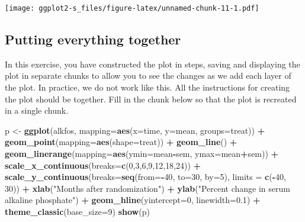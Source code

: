 \documentclass[
]{book}
\newenvironment{Shaded}{\begin{snugshade}}{\end{snugshade}}
\newcommand{\AttributeTok}[1]{\textcolor[rgb]{0.13,0.29,0.53}{#1}}
\newcommand{\DecValTok}[1]{\textcolor[rgb]{0.00,0.00,0.81}{#1}}
\newcommand{\FloatTok}[1]{\textcolor[rgb]{0.00,0.00,0.81}{#1}}
\newcommand{\FunctionTok}[1]{\textcolor[rgb]{0.13,0.29,0.53}{\textbf{#1}}}
\newcommand{\NormalTok}[1]{#1}
\newcommand{\OtherTok}[1]{\textcolor[rgb]{0.56,0.35,0.01}{#1}}
\newcommand{\SpecialCharTok}[1]{\textcolor[rgb]{0.81,0.36,0.00}{\textbf{#1}}}
\newcommand{\StringTok}[1]{\textcolor[rgb]{0.31,0.60,0.02}{#1}}
\begin{document}
\texttt{[image: ggplot2-s\_files/figure-latex/unnamed-chunk-11-1.pdf]}

\subsection{Putting everything together}\label{putting-everything-together}

In this exercise, you have constructed the plot in steps, saving and displaying the plot in separate chunks to allow you to see the changes as we add each layer of the plot. In practice, we do not work like this. All the instructions for creating the plot should be together. Fill in the chunk below so that the plot is recreated in a single chunk.

\begin{Shaded}
\begin{Highlighting}[]
\NormalTok{p }\OtherTok{\textless{}{-}} \FunctionTok{ggplot}\NormalTok{(alkfos, }\AttributeTok{mapping=}\FunctionTok{aes}\NormalTok{(}\AttributeTok{x=}\NormalTok{time, }\AttributeTok{y=}\NormalTok{mean, }\AttributeTok{groups=}\NormalTok{treat)) }\SpecialCharTok{+}
  \FunctionTok{geom\_point}\NormalTok{(}\AttributeTok{mapping=}\FunctionTok{aes}\NormalTok{(}\AttributeTok{shape=}\NormalTok{treat)) }\SpecialCharTok{+}
  \FunctionTok{geom\_line}\NormalTok{() }\SpecialCharTok{+}
  \FunctionTok{geom\_linerange}\NormalTok{(}\AttributeTok{mapping=}\FunctionTok{aes}\NormalTok{(}\AttributeTok{ymin=}\NormalTok{mean}\SpecialCharTok{{-}}\NormalTok{sem, }\AttributeTok{ymax=}\NormalTok{mean}\SpecialCharTok{+}\NormalTok{sem)) }\SpecialCharTok{+}
  \FunctionTok{scale\_x\_continuous}\NormalTok{(}\AttributeTok{breaks=}\FunctionTok{c}\NormalTok{(}\DecValTok{0}\NormalTok{,}\DecValTok{3}\NormalTok{,}\DecValTok{6}\NormalTok{,}\DecValTok{9}\NormalTok{,}\DecValTok{12}\NormalTok{,}\DecValTok{18}\NormalTok{,}\DecValTok{24}\NormalTok{)) }\SpecialCharTok{+}
  \FunctionTok{scale\_y\_continuous}\NormalTok{(}\AttributeTok{breaks=}\FunctionTok{seq}\NormalTok{(}\AttributeTok{from=}\SpecialCharTok{{-}}\DecValTok{40}\NormalTok{, }\AttributeTok{to=}\DecValTok{30}\NormalTok{, }\AttributeTok{by=}\DecValTok{5}\NormalTok{),}
                     \AttributeTok{limits =} \FunctionTok{c}\NormalTok{(}\SpecialCharTok{{-}}\DecValTok{40}\NormalTok{, }\DecValTok{30}\NormalTok{)) }\SpecialCharTok{+}
  \FunctionTok{xlab}\NormalTok{(}\StringTok{"Months after randomization"}\NormalTok{) }\SpecialCharTok{+} 
  \FunctionTok{ylab}\NormalTok{(}\StringTok{"Percent change in serum alkaline phosphate"}\NormalTok{) }\SpecialCharTok{+}
  \FunctionTok{geom\_hline}\NormalTok{(}\AttributeTok{yintercept=}\DecValTok{0}\NormalTok{, }\AttributeTok{linewidth=}\FloatTok{0.1}\NormalTok{) }\SpecialCharTok{+}
  \FunctionTok{theme\_classic}\NormalTok{(}\AttributeTok{base\_size=}\DecValTok{9}\NormalTok{)}
\FunctionTok{show}\NormalTok{(p)}
\end{Highlighting}
\end{Shaded}
\end{document}
